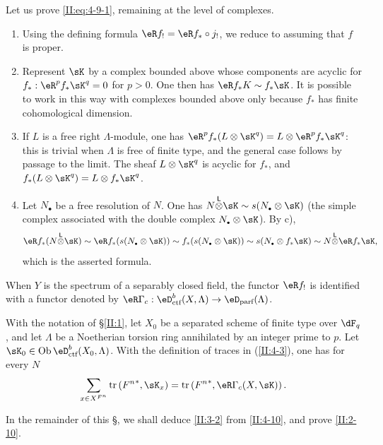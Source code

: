 Let us prove \eqref{II:eq:4-9-1}, remaining at the level of complexes.
\begin{enumerate}[\indent a)]
  \item Using the defining formula $\eR f_! = \eR f_*\circ j_!$, we reduce to
    assuming that $f$ is proper.
  \item Represent $\sK$ by a complex bounded above whose components are
    acyclic for $f_*:\eR^p f_* \sK^q = 0$ for $p>0$. One then has
    $\eR f_* K \sim f_* \sK$. It is possible to work in this way with
    complexes bounded above only because $f_*$ has finite cohomological
    dimension.
  \item If $L$ is a free right $\Lambda$-module, one has
    $\eR^p f_*(L\otimes \sK^q) = L\otimes \eR^p f_* \sK^q$: this is trivial
    when $\Lambda$ is free of finite type, and the general case follows by
    passage to the limit. The sheaf $L\otimes \sK^q$ is acyclic for $f_*$,
    and $f_*(L\otimes \sK^q) = L\otimes f_* \sK^q$.
  \item Let $N_\bullet$ be a free resolution of $N$. One has
    $N\lotimes \sK\sim s(N_\bullet\otimes \sK)$ (the simple complex
    associated with the double complex $N_\bullet\otimes \sK$). By c),
    \[
      \eR f_*(N\lotimes \sK) \sim \eR f_* (s(N_\bullet\otimes \sK)) \sim f_*(s(N_\bullet\otimes \sK)) \sim s(N_\bullet\otimes f_* \sK) \sim N\lotimes \eR f_* \sK \text{,}
    \]
    which is the asserted formula.
\end{enumerate}

When $Y$ is the spectrum of a separably closed field, the functor $\eR f_!$
is identified with a functor denoted by
$\eR \Gamma_c : \eD_\text{ctf}^b(X,\Lambda)\to\eD_\text{parf}(\Lambda)$.






\begin{theorem_}\label{II:4-10}
With the notation of \S\ref{II:1}, let $X_0$ be a separated scheme of finite
type over $\dF_q$, and let $\Lambda$ be a Noetherian torsion ring annihilated
by an integer prime to $p$. Let
$\sK_0\in\ob\eD_\textnormal{ctf}^b(X_0,\Lambda)$. With the definition of
traces in (\ref{II:4-3}), one has for every $N$
\begin{equation*}\label{II:eq:4-10}
  \sum_{x\in X^{F^n}} \tr\left({F^n}^*,\sK_x\right) = \tr\left({F^n}^*,\eR\Gamma_c(X,\sK)\right) \text{.}
\end{equation*}
\end{theorem_}

In the remainder of this \S, we shall deduce \ref{II:3-2} from
\ref{II:4-10}, and prove \ref{II:2-10}.






